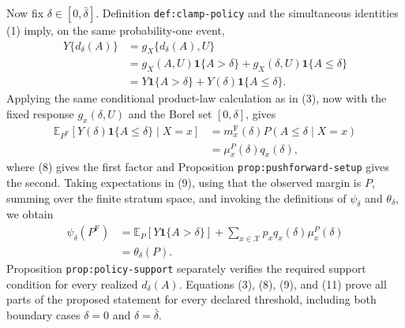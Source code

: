 Now fix \(\delta\in[0,\bar\delta]\).  Definition \texttt{def:clamp-policy} and the simultaneous identities (1) imply, on the same probability-one event,
\[
\begin{aligned}
 Y\{d_\delta(A)\}
 &=g_X\{d_\delta(A),U\}\\
 &=g_X(A,U)\mathbf 1\{A>\delta\}
   +g_X(\delta,U)\mathbf 1\{A\leq\delta\}\\
 &=Y\mathbf 1\{A>\delta\}
   +Y(\delta)\mathbf 1\{A\leq\delta\}.
\end{aligned}
\tag{9}
\]
Applying the same conditional product-law calculation as in (3), now with the fixed response \(g_x(\delta,U)\) and the Borel set \([0,\delta]\), gives
\[
\begin{aligned}
 \mathbb E_{P^{\mathrm F}}[Y(\delta)\mathbf 1\{A\leq\delta\}\mid X=x]
 &=m_x^{\mathrm F}(\delta)P(A\leq\delta\mid X=x)\\
 &=\mu_x^P(\delta)q_x(\delta),
\end{aligned}
\tag{10}
\]
where (8) gives the first factor and Proposition \texttt{prop:pushforward-setup} gives the second.  Taking expectations in (9), using that the observed margin is \(P\), summing over the finite stratum space, and invoking the definitions of \(\psi_\delta\) and \(\theta_\delta\), we obtain
\[
\begin{aligned}
 \psi_\delta(P^{\mathrm F})
 &=\mathbb E_P[Y\mathbf 1\{A>\delta\}]
   +\sum_{x\in\mathcal X}p_xq_x(\delta)\mu_x^P(\delta)\\
 &=\theta_\delta(P).
\end{aligned}
\tag{11}
\]
Proposition \texttt{prop:policy-support} separately verifies the required support condition for every realized \(d_\delta(A)\).  Equations (3), (8), (9), and (11) prove all parts of the proposed statement for every declared threshold, including both boundary cases \(\delta=0\) and \(\delta=\bar\delta\).